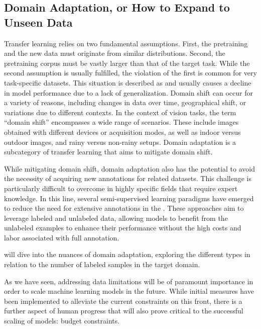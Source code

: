 \subsection{Domain Adaptation, or How to Expand to Unseen Data}\label{subsec:da_intro}
Transfer learning relies on two fundamental assumptions. First, the pretraining and the new data must originate from similar distributions. Second, the pretraining corpus must be vastly larger than that of the target task. While the second assumption is usually fulfilled, the violation of the first is common for very task-specific datasets. This situation is described as  and usually causes a decline in model performance due to a lack of generalization. Domain shift can occur for a variety of reasons, including changes in data over time, geographical shift, or variations due to different contexts. In the context of vision tasks, the term ``domain shift'' encompasses a wide range of scenarios. These include images obtained with different devices or acquisition modes, as well as indoor versus outdoor images, and rainy versus non-rainy setups. Domain adaptation is a subcategory of transfer learning that aims to mitigate domain shift.

While mitigating domain shift, domain adaptation also has the potential to avoid the necessity of acquiring new annotations for related datasets. This challenge is particularly difficult to overcome in highly specific fields that require expert knowledge. In this line, several semi-supervised learning paradigms have emerged to reduce the need for extensive annotations in the . These approaches aim to leverage labeled and unlabeled data, allowing models to benefit from the unlabeled examples to enhance their performance without the high costs and labor associated with full annotation. 


 will dive into the nuances of domain adaptation, exploring the different types in relation to the number of labeled samples in the target domain.

\sectionlinenew

As we have seen, addressing data limitations will be of paramount importance in order to scale machine learning models in the future. While initial measures have been implemented to alleviate the current constraints on this front, there is a further aspect of human progress that will also prove critical to the successful scaling of models: budget constraints.
